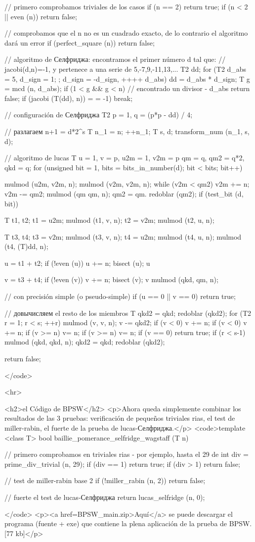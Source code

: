 {

// primero comprobamos triviales de los casos
if (n == 2)
return true;
if (n < 2 || even (n))
return false;

// comprobamos que el n no es un cuadrado exacto, de lo contrario el algoritmo dará un error
if (perfect_square (n))
return false;

// algoritmo de Селфриджа: encontramos el primer número d tal que:
// jacobi(d,n)=-1, y pertenece a una serie de { 5,-7,9,-11,13,... }
T2 dd;
for (T2 d_abs = 5, d_sign = 1; ; d_sign = -d_sign, ++++ d_abs)
{
dd = d_abs * d_sign;
T g = mcd (n, d_abs);
if (1 < g && g < n)
// encontrado un divisor - d_abs
return false;
if (jacobi (T(dd), n)) = = -1)
break;
}

// configuración de Селфриджа
T2
p = 1,
q = (p*p - dd) / 4;

// разлагаем n+1 = d*2^s
T n_1 = n;
++n_1;
T s, d;
transform_num (n_1, s, d);

// algoritmo de lucas
T
u = 1,
v = p,
u2m = 1,
v2m = p
qm = q,
qm2 = q*2,
qkd = q;
for (unsigned bit = 1, bits = bits_in_number(d); bit < bits; bit++)
{
mulmod (u2m, v2m, n);
mulmod (v2m, v2m, n);
while (v2m < qm2)
v2m += n;
v2m -= qm2;
mulmod (qm qm, n);
qm2 = qm.
redoblar (qm2);
if (test_bit (d, bit))
{
T t1, t2;
t1 = u2m;
mulmod (t1, v, n);
t2 = v2m;
mulmod (t2, u, n);

T t3, t4;
t3 = v2m;
mulmod (t3, v, n);
t4 = u2m;
mulmod (t4, u, n);
mulmod (t4, (T)dd, n);

u = t1 + t2;
if (!even (u))
u += n;
bisect (u);
u %

v = t3 + t4;
if (!even (v))
v += n;
bisect (v);
v %
mulmod (qkd, qm, n);
}
}

// con precisión simple (o pseudo-simple)
if (u == 0 || v == 0)
return true;

// довычисляем el resto de los miembros
T qkd2 = qkd;
redoblar (qkd2);
for (T2 r = 1; r < s; ++r)
{
mulmod (v, v, n);
v -= qkd2;
if (v < 0) v += n;
if (v < 0) v += n;
if (v >= n) v= n;
if (v >= n) v= n;
if (v == 0)
return true;
if (r < s-1)
{
mulmod (qkd, qkd, n);
qkd2 = qkd;
redoblar (qkd2);
}
}

return false;

}</code>

<hr>

<h2>el Código de BPSW</h2>
<p>Ahora queda simplemente combinar los resultados de las 3 pruebas: verificación de pequeños triviales rias, el test de miller-rabin, el fuerte de la prueba de lucas-Селфриджа.</p>
<code>template <class T>
bool baillie_pomerance_selfridge_wagstaff (T n)
{

// primero comprobamos en triviales rias - por ejemplo, hasta el 29 de
int div = prime_div_trivial (n, 29);
if (div == 1)
return true;
if (div > 1)
return false;

// test de miller-rabin base 2
if (!miller_rabin (n, 2))
return false;

// fuerte el test de lucas-Селфриджа
return lucas_selfridge (n, 0);

}</code>
<p><a href=BPSW_main.zip>Aquí</a> se puede descargar el programa (fuente + exe) que contiene la plena aplicación de la prueba de BPSW. [77 kb]</p>

